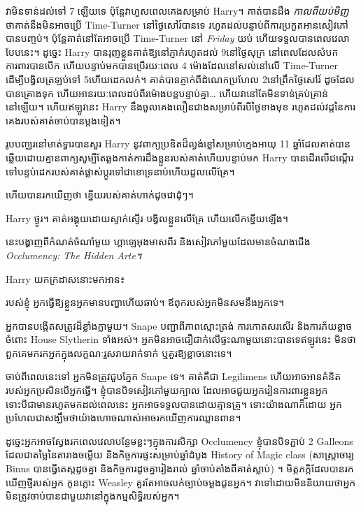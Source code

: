 {{{វាមិនទាន់ដល់ទៅ 7ៅឡើយទេ ប៉ុន្តែវាហួសពេលគេងសម្រាប់ Harry។ គាត់បានដឹង \emph{កាលពីយប់មិញ} ថាគាត់នឹងមិនអាចប្រើ Time-Turner នៅថ្ងៃសៅរ៍បានទេ រហូតដល់បន្ទាប់ពីការប្រកួតអានសៀវភៅបានបញ្ចប់។ ប៉ុន្តែគាត់នៅតែអាចប្រើ Time-Turner នៅ \emph{Friday} យប់ ហើយទទួលបានពេលវេលាបែបនេះ។ ដូច្នេះ Harry បានរុញខ្លួនគាត់ឱ្យនៅភ្ញាក់រហូតដល់ 9\pm នៅថ្ងៃសុក្រ នៅពេលដែលសំបកការពារបានបើក ហើយបន្ទាប់មកបានប្រើរយៈពេល 4 ម៉ោងដែលនៅសល់នៅលើ Time-Turner ដើម្បីបង្វិលត្រឡប់ទៅ 5\pm ហើយដេកលក់។ គាត់បានភ្ញាក់ពីដំណេកប្រហែល 2\am នៅព្រឹកថ្ងៃសៅរ៍ ដូចដែលបានគ្រោងទុក ហើយអានរយៈពេលដប់ពីរម៉ោងបន្តបន្ទាប់គ្នា… ហើយវានៅតែមិនទាន់គ្រប់គ្រាន់នៅឡើយ។ ហើយឥឡូវនេះ Harry នឹងចូលគេងលឿនជាងសម្រាប់ពីរបីថ្ងៃខាងមុខ រហូតដល់វដ្តនៃការគេងរបស់គាត់ចាប់បានម្តងទៀត។

រូបបញ្ឈរនៅមាត់ទ្វារបានសួរ Harry នូវពាក្យប្រឌិតដ៏ល្ងង់ខ្លៅសម្រាប់ក្មេងអាយុ 11 ឆ្នាំដែលគាត់បានឆ្លើយដោយគ្មានពាក្យសូម្បីតែឆ្លងកាត់ការដឹងខ្លួនរបស់គាត់ហើយបន្ទាប់មក Harry បានដើរលើជណ្តើរទៅបន្ទប់ដេករបស់គាត់ផ្លាស់ប្តូរទៅជាខោទ្រនាប់ហើយដួលលើគ្រែ។

ហើយ​បាន​រក​ឃើញ​ថា ខ្នើយ​របស់​គាត់​ហាក់​ដូច​ជា​ដុំៗ។

Harry ថ្ងូរ។ គាត់អង្គុយដោយស្ទាក់ស្ទើរ បង្វិលខ្លួនលើគ្រែ ហើយលើកខ្នើយឡើង។

នេះបង្ហាញពីកំណត់ចំណាំមួយ ហ្គាឡេអុងមាសពីរ និងសៀវភៅមួយដែលមានចំណងជើង \emph{Occlumency: The Hidden Arte។}

Harry យក​ក្រដាស​នោះ​មក​អាន៖

\begin{writtenNote}
របស់ខ្ញុំ អ្នកធ្វើឱ្យខ្លួនអ្នកមានបញ្ហាហើយឆាប់។ ឪពុករបស់អ្នកមិនសមនឹងអ្នកទេ។

អ្នកបានបង្កើតសត្រូវដ៏ខ្លាំងក្លាមួយ។ Snape បញ្ជាពីភាពស្មោះត្រង់ ការកោតសរសើរ និងការភ័យខ្លាចចំពោះ House Slytherin ទាំងអស់។ អ្នកមិនអាចជឿជាក់លើផ្ទះណាមួយនោះបានទេឥឡូវនេះ មិនថាពួកគេមករកអ្នកក្នុងលក្ខណៈរួសរាយរាក់ទាក់ ឬគួរឱ្យខ្លាចនោះទេ។

ចាប់ពីពេលនេះទៅ អ្នកមិនត្រូវជួបភ្នែក Snape ទេ។ គាត់គឺជា Legilimens ហើយអាចអានគំនិតរបស់អ្នកប្រសិនបើអ្នកធ្វើ។ ខ្ញុំបានបិទសៀវភៅមួយក្បាល ដែលអាចជួយអ្នករៀនការពារខ្លួនអ្នក ទោះបីជាមានរហូតមកដល់ពេលនេះ អ្នកអាចទទួលបានដោយគ្មានគ្រូ។ ទោះយ៉ាងណាក៏ដោយ អ្នកប្រហែលជាសង្ឃឹមថាយ៉ាងហោចណាស់អាចរកឃើញការឈ្លានពាន។

ដូច្នេះអ្នកអាចស្វែងរកពេលវេលាបន្ថែមខ្លះៗក្នុងការសិក្សា Occlumency ខ្ញុំបានបិទភ្ជាប់ 2 Galleons ដែលជាតម្លៃនៃតារាងចម្លើយ និងកិច្ចការផ្ទះសម្រាប់ឆ្នាំដំបូង History of Magic class (សាស្រ្តាចារ្យ Binns បានធ្វើតេស្តដូចគ្នា និងកិច្ចការដូចគ្នារៀងរាល់ ឆ្នាំចាប់តាំងពីគាត់ស្លាប់) ។ មិត្តភក្តិដែលបានរកឃើញថ្មីរបស់អ្នក កូនភ្លោះ Weasley គួរតែអាចលក់ច្បាប់ចម្លងជូនអ្នក។ វា​ទៅ​ដោយ​មិន​និយាយ​ថា​អ្នក​មិន​ត្រូវ​ចាប់​បាន​ជាមួយ​វា​នៅ​ក្នុង​កម្មសិទ្ធិ​របស់​អ្នក​។


\end{writtenNote}}}}
